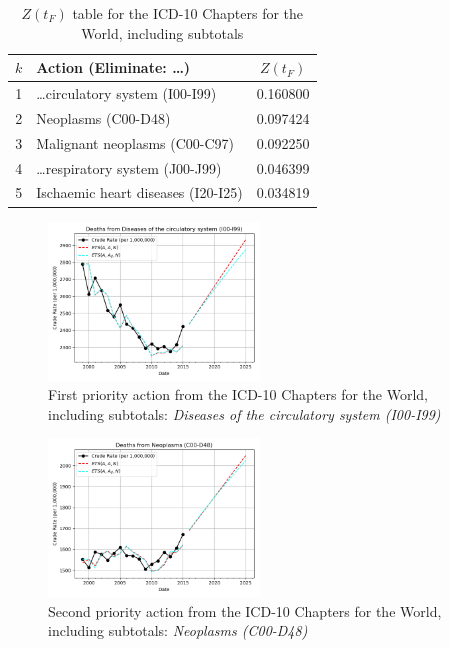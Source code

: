 \documentclass[10pt, a4paper, twocolumn]{IEEEconf}
\begin{document}
\begin{table}[H]
  \centering
  \begin{tabular}{clc}
    \toprule
      $k$ & Action (Eliminate: \ldots) & $Z(t_F)$ \\
    \midrule
      1 &          \ldots circulatory system (I00-I99) & 0.160800 \\
      2 &                          Neoplasms (C00-D48) & 0.097424 \\
      3 &                Malignant neoplasms (C00-C97) & 0.092250 \\
      4 &          \ldots respiratory system (J00-J99) & 0.046399 \\
      5 &           Ischaemic heart diseases (I20-I25) & 0.034819 \\
    \bottomrule
  \end{tabular}
  \caption{$Z(t_F)$ table for the ICD-10 Chapters for the World, including subtotals}
  \label{table:ztable9}
\end{table}

\begin{figure}[H]
  \centering
  \includegraphics[width=0.5\textwidth]{results/WORLD_ICD10_CHAPTERS_ALL/Diseases_of_the_circulatory_system_I00-I99_ets.png}
  \caption{First priority action from the ICD-10 Chapters for the World, including subtotals: \textit{Diseases of the circulatory system (I00-I99)}}\label{fig:k9a}
\end{figure}

\begin{figure}[H]
  \centering
  \includegraphics[width=0.5\textwidth]{results/WORLD_ICD10_CHAPTERS_ALL/Neoplasms_C00-D48_ets.png}
  \caption{Second priority action from the ICD-10 Chapters for the World, including subtotals: \textit{Neoplasms (C00-D48)}}\label{fig:k9b}
\end{figure}
\end{document}
